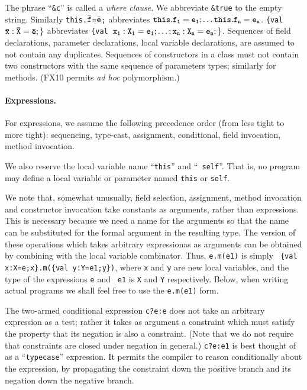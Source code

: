 \documentclass{article}
\def\FXten{{\sf FX10}}
\begin{document}
The phrase ``{\tt \&c}'' is called a {\em where clause}. We abbreviate
{\tt \&true} to the empty string. Similarly {\tt this.$\bar{\tt
f}$=$\bar{\tt e}$;} abbreviates {$\tt this.f_1=e_1;\ldots
this.f_n=e_n$}.  {\tt \{val $\tt\bar{\tt x}:\bar{\tt X}=\bar{\tt e};\}$}
abbreviates {\tt \{val $\tt x_1: X_1= e_1;\ldots; x_n:X_n=e_n;\}$}.
Sequences of field declarations, parameter declarations, local
variable declarations, are assumed to not contain any duplicates.
Sequences of constructors in a class must not contain two constructors
with the same sequence of parameters types; similarly for
methods. (\FXten{} permits {\em ad hoc} polymorphism.)

\paragraph{Expressions.}
For expressions, we assume the following precedence order (from less
tight to more tight): sequencing, type-cast, assignment, conditional,
field invocation, method invocation.

We also reserve the local variable name ``{\tt this}'' and ``{\tt
self}''. That is, no program may define a local variable or parameter
named {\tt this} or {\tt self}. 

We note that, somewhat unusually, field selection, assignment, method
invocation and constructor invocation take constants as arguments,
rather than expressions. This is necessary because we need a name for
the arguments so that the name can be substituted for the formal
argument in the resulting type. The version of these operations which
takes arbitrary expressionas as arguments can be obtained by combining
with the local variable combinator. Thus, {\tt e.m(e1)} is simply {\tt
\{val x:X=e;x\}.m(\{val y:Y=e1;y\})}, where {\tt x} and {\tt y} are
new local variables, and the type of the expressions {\tt e} and {\tt
e1} is {\tt X} and {\tt Y} respectively. Below, when writing actual
programs we shall feel free to use the {\tt e.m(e1)} form.

The two-armed conditional expression {\tt c?e:e} does not take an
arbitrary expression as a test; rather it takes as argument a
constraint which must satisfy the property that its negation is also a
constraint. (Note that we do not require that constraints are closed
under negation in general.) {\tt c?e:e1} is best thought of as a
``{\tt typecase}'' expression. It permits the compiler to reason
conditionally about the expression, by propagating the
constraint down the positive branch and its negation down the negative
branch.
\end{document}
